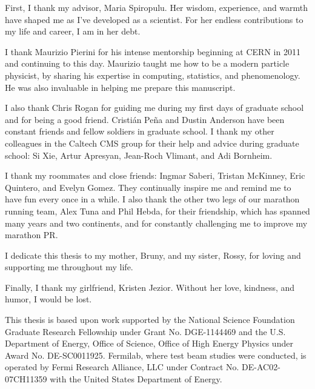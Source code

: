\begin{acknowledgments}     %
                                                                                                         
First, I thank my advisor, Maria Spiropulu. Her
wisdom, experience, and warmth have shaped me as I've
developed as a scientist. For her endless contributions to my life
and career, I am in her debt.

I thank Maurizio Pierini for his intense mentorship beginning at CERN
in 2011 and continuing to this day. Maurizio taught me how to be a
modern particle physicist, by sharing his expertise in computing, statistics, and
phenomenology. He was also invaluable in helping me prepare this manuscript.

I also thank Chris Rogan for guiding me during my first days of
graduate school and for being a good friend. Cristi\'{a}n Pe\~{n}a and
Dustin Anderson have been constant friends and fellow soldiers in
graduate school. I thank my other colleagues in the Caltech CMS group
for their help and advice during graduate school: Si Xie, Artur
Apresyan, Jean-Roch Vlimant, and Adi Bornheim.

I thank my roommates and close friends: Ingmar Saberi, Tristan McKinney,
Eric Quintero, and Evelyn Gomez. They continually inspire me and
remind me to have fun every once in a while. 
I also thank the other two legs of our marathon running team, Alex Tuna and Phil Hebda, for their friendship,
which has spanned many years and two continents, and for constantly challenging
me to improve my marathon PR.

I dedicate this thesis to my mother, Bruny, and my sister, Rossy, for
loving and supporting me throughout my life.

Finally, I thank my girlfriend, Kristen Jezior. Without her love,
kindness, and humor, I would be lost.

This thesis is based upon work supported by the National
Science Foundation Graduate Research Fellowship under Grant
No. DGE-1144469 and the U.S. Department of Energy, Office of Science,
Office of High Energy Physics under Award No. DE-SC0011925. Fermilab,
where test beam studies were conducted, is operated by Fermi Research
Alliance, LLC under Contract No. DE-AC02-07CH11359 with the United
States Department of Energy.

\end{acknowledgments}